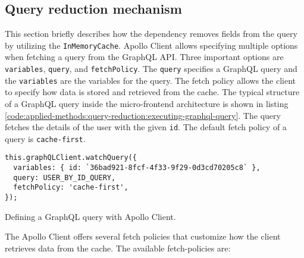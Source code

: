 \subsection{Query reduction mechanism}\label{subsection:applied-methods:query-reduction:how-does-the-library-work}

This section briefly describes how the dependency removes fields from the query by utilizing the \texttt{InMemoryCache}. Apollo Client allows specifying multiple options when fetching a query from the GraphQL \ac{API}. Three important options are \texttt{variables}, \texttt{query}, and \texttt{fetchPolicy}. The \texttt{query} specifies a GraphQL query and the \texttt{variables} are the variables for the query. The fetch policy allows the client to specify how data is stored and retrieved from the cache. The typical structure of a GraphQL query inside the micro-frontend architecture is shown in listing \ref{code:applied-methods:query-reduction:executing-graphql-query}. The query fetches the details of the user with the given \texttt{id}. The default fetch policy of a query is \texttt{cache-first}.

\ifshowListings
\begin{listing}[H]
\begin{verbatim}
this.graphQLClient.watchQuery({
  variables: { id: `36bad921-8fcf-4f33-9f29-0d3cd70205c8` },
  query: USER_BY_ID_QUERY,
  fetchPolicy: 'cache-first',
});
\end{verbatim}
\caption{Defining a GraphQL query with Apollo Client.}\label{code:applied-methods:query-reduction:executing-graphql-query}
\end{listing}
\fi

\noindent The Apollo Client offers several fetch policies that customize how the client retrieves data from the cache. The available fetch-policies are: \cite{misc:-:applied-methods:query-reduction:apollo-client:queries}

